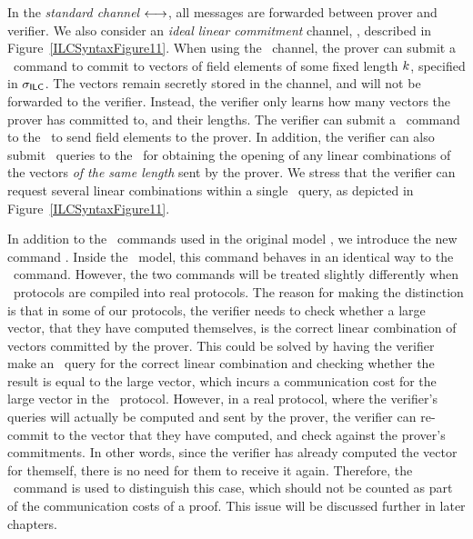 In the \emph{standard channel} $\longleftrightarrow$, all messages are forwarded between prover and verifier. 
We also consider an \emph{ideal linear commitment}  channel, \ILC, described in Figure~\ref{ILCSyntaxFigure11}. 
When using the \ILC\ channel, the prover can submit a \ILCcommit\ command to commit to 
vectors of field elements of some fixed length $k$, specified in $\mathsf{\sigma}_{\mathsf{ILC}}$. The vectors remain secretly stored in the channel, and will not be forwarded to the verifier. Instead, the verifier only learns how many vectors the prover has committed to, and their lengths. The verifier can submit a \ILCsend\ command to the \ILC\ to send field elements to the prover. In addition, the verifier can also submit \ILCopen\ queries to the \ILC\ for obtaining the opening of any linear combinations of the vectors \emph{of the same length} sent by the prover. We stress that the verifier can request several linear combinations within a single \ILCopen\ query, as depicted in Figure~\ref{ILCSyntaxFigure11}.

In addition to the \ILC\ commands used in the original model \cite{BootleCGGHJ17}, we introduce the new command \ILCcheck. Inside the \ILC \ model, this command behaves in an identical way to the \ILCsend\ command. However, the two commands will be treated slightly differently when \ILC\ protocols are compiled into real protocols. The reason for making the distinction is that in some of our protocols, the verifier needs to check whether a large vector, that they have computed themselves, is the correct linear combination of vectors committed by the prover. This could be solved by having the verifier make an \ILCsend\ query for the correct linear combination and checking whether the result is equal to the large vector, which incurs a communication cost for the large vector in the \ILC\ protocol. However, in a real protocol, where the verifier's queries will actually be computed and sent by the prover, the verifier can re-commit to the vector that they have computed, and check against the prover's commitments. In other words, since the verifier has already computed the vector for themself, there is no need for them to receive it again. Therefore, the \ILCcheck\ command is used to distinguish this case, which should not be counted as part of the communication costs of a proof. This issue will be discussed further in later chapters.

